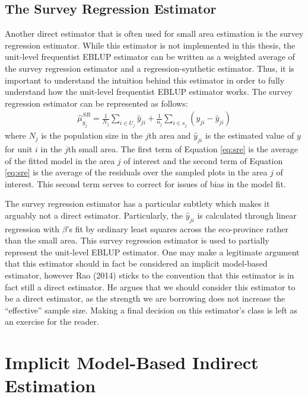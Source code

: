 \documentclass[12pt,twoside]{reedthesis}
\begin{document}
\hypertarget{the-survey-regression-estimator}{%
\subsection{The Survey Regression Estimator}\label{the-survey-regression-estimator}}

Another direct estimator that is often used for small area estimation is the survey regression estimator. While this estimator is not implemented in this thesis, the unit-level frequentist EBLUP estimator can be written as a weighted average of the survey regression estimator and a regression-synthetic estimator. Thus, it is important to understand the intuition behind this estimator in order to fully understand how the unit-level frequentist EBLUP estimator works. The survey regression estimator can be represented as follows:
\begin{align}
\hat \mu_{y_j}^{SR} = \frac{1}{N_j} \sum_{i \in U_j} \hat y_{ji} +
\frac{1}{n_j} \sum_{i \in s_j} (y_{ji} - \hat y_{ji}) \label{eq:sre}
\end{align}
where \(N_j\) is the population size in the \(j\)th area and \(\hat y_{ji}\) is the estimated value of \(y\) for unit \(i\) in the \(j\)th small area. The first term of Equation \eqref{eq:sre} is the average of the fitted model in the area \(j\) of interest and the second term of Equation \eqref{eq:sre} is the average of the residuals over the sampled plots in the area \(j\) of interest. This second term serves to correct for issues of bias in the model fit.

The survey regression estimator has a particular subtlety which makes it arguably not a direct estimator. Particularly, the \(\hat y_{ji}\) is calculated through linear regression with \(\beta\)'s fit by ordinary least squares across the eco-province rather than the small area. This survey regression estimator is used to partially represent the unit-level EBLUP estimator. One may make a legitimate argument that this estimator should in fact be considered an implicit model-based estimator, however Rao (2014) sticks to the convention that this estimator is in fact still a direct estimator. He argues that we should consider this estimator to be a direct estimator, as the strength we are borrowing does not increase the ``effective'' sample size. Making a final decision on this estimator's class is left as an exercise for the reader.

\hypertarget{implicit-model-based-indirect-estimation}{%
\section{Implicit Model-Based Indirect Estimation}\label{implicit-model-based-indirect-estimation}}
\end{document}
